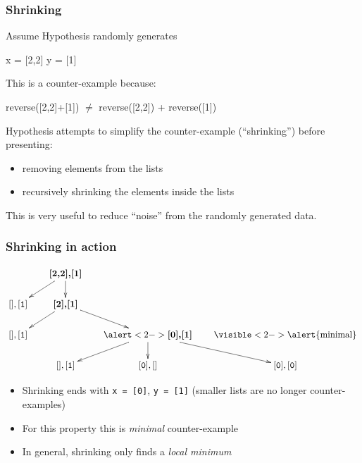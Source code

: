 \documentclass{beamer}
\newcommand{\counter}[1]{\textbf{#1}}
\newcommand{\noncounter}[1]{{\mathtt{#1}}}
\begin{document}
\begin{frame}
  \frametitle{Shrinking}

Assume Hypothesis randomly generates
\begin{semiverbatim}
x = [2,2]
y = [1]
\end{semiverbatim}
This is a counter-example because:
\begin{semiverbatim}
      reverse([2,2]+[1]) \ensuremath{\neq}  reverse([2,2]) + reverse([1])
\end{semiverbatim}
\medskip

Hypothesis attempts to simplify
the counter-example (``shrinking'')
before presenting:
\begin{itemize}
\item removing elements from the lists
\item recursively shrinking the elements inside the lists
\end{itemize}
This is very useful to reduce ``noise'' from the randomly generated data.
\end{frame}

\begin{frame}
\frametitle{Shrinking in action}

\[ \xymatrix@-0.5pc{
 & \counter{[2,2],[1]}\ar[dl]\ar[d] \\
 \noncounter{[],[1]} &  \counter{[2],[1]}\ar[dl]\ar[dr] \\
 \noncounter{[],[1]} & &\alert<2->{\counter{[0],[1]}}\ar[dl]\ar[d]\ar[dr]
 &  \visible<2->{\alert{\text{minimal}}} \\
&  \noncounter{[],[1]} & \noncounter{[0],[]} & \noncounter{[0],[0]}
} 
\]

\begin{itemize}
\item Shrinking ends with  \texttt{x = [0]}, \texttt{y = [1]}
  (smaller lists are no longer counter-examples)
\item For this property this is \emph{minimal} counter-example
\item In general, shrinking only finds a \emph{local minimum}
\end{itemize}
\end{frame}
\end{document}
